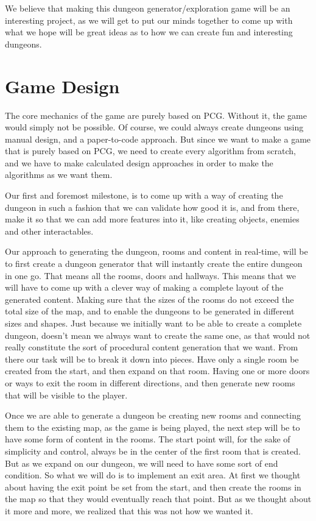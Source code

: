 \documentclass[conference,compsoc]{IEEEtran}
\begin{document}
We believe that making this dungeon generator/exploration game will be an interesting project, as we will get to put our minds together to come up with what we hope will be great ideas as to how we can create fun and interesting dungeons. 

\section{Game Design}
The core mechanics of the game are purely based on PCG. Without it, the game would simply not be possible. Of course, we could always create dungeons using manual design, and a paper-to-code approach. But since we want to make a game that is purely based on PCG, we need to create every algorithm from scratch, and we have to make calculated design approaches in order to make the algorithms as we want them.

Our first and foremost milestone, is to come up with a way of creating the dungeon in such a fashion that we can validate how good it is, and from there, make it so that we can add more features into it, like creating objects, enemies and other interactables. 

Our approach to generating the dungeon, rooms and content in real-time, will be to first create a dungeon generator that will instantly create the entire dungeon in one go. That means all the rooms, doors and hallways. This means that we will have to come up with a clever way of making a complete layout of the generated content. Making sure that the sizes of the rooms do not exceed the total size of the map, and to enable the dungeons to be generated in different sizes and shapes. Just because we initially want to be able to create a complete dungeon, doesn't mean we always want to create the same one, as that would not really constitute the sort of procedural content generation that we want. 
From there our task will be to break it down into pieces. Have only a single room be created from the start, and then expand on that room. Having one or more doors or ways to exit the room in different directions, and then generate new rooms that will be visible to the player.

Once we are able to generate a dungeon be creating new rooms and connecting them to the existing map, as the game is being played, the next step will be to have some form of content in the rooms.
The start point will, for the sake of simplicity and control, always be in the center of the first room that is created. But as we expand on our dungeon, we will need to have some sort of end condition. So what we will do is to implement an exit area. At first we thought about having the exit point be set from the start, and then create the rooms in the map so that they would eventually reach that point. But as we thought about it more and more, we realized that this was not how we wanted it. 
\end{document}
